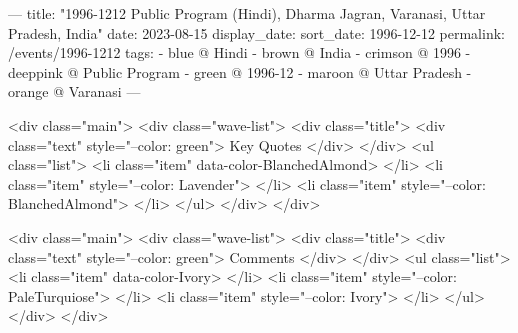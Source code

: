 ---
title: "1996-1212 Public Program (Hindi), Dharma Jagran, Varanasi, Uttar Pradesh, India"
date: 2023-08-15
display_date: 
sort_date: 1996-12-12
permalink: /events/1996-1212
tags:
  - blue @ Hindi
  - brown @ India
  - crimson @ 1996
  - deeppink @ Public Program
  - green @ 1996-12
  - maroon @ Uttar Pradesh
  - orange @ Varanasi
---

<div class="main">
  <div class="wave-list">
    <div class="title">
      <div class="text" style="--color: green">
        Key Quotes
      </div>
    </div>
    <ul class="list">
        <li class="item" data-color-BlanchedAlmond>
        </li>
        <li class="item" style="--color: Lavender">
        </li>
        <li class="item" style="--color: BlanchedAlmond">
        </li>
      </ul>
  </div>
</div>

<div class="main">
  <div class="wave-list">
    <div class="title">
      <div class="text" style="--color: green">
        Comments
      </div>
    </div>
    <ul class="list">
        <li class="item" data-color-Ivory>
        </li>
        <li class="item" style="--color: PaleTurquiose">
        </li>
        <li class="item" style="--color: Ivory">
        </li>
      </ul>
  </div>
</div>